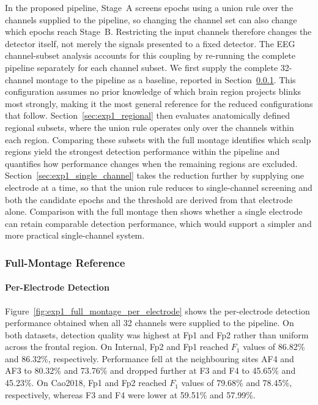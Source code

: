 \documentclass[journal,twoside,web]{ieeecolor}
\begin{document}
In the proposed pipeline, Stage~A screens epochs using a union rule over the channels supplied to the pipeline, so changing the channel set can also change which epochs reach Stage~B. Restricting the input channels therefore changes the detector itself, not merely the signals presented to a fixed detector. The EEG channel-subset analysis accounts for this coupling by re-running the complete pipeline separately for each channel subset. We first supply the complete 32-channel montage to the pipeline as a baseline, reported in Section~\ref{sec:exp1_reference}. This configuration assumes no prior knowledge of which brain region projects blinks most strongly, making it the most general reference for the reduced configurations that follow.
%
Section~\ref{sec:exp1_regional} then evaluates anatomically defined regional subsets, where the union rule operates only over the channels within each region. Comparing these subsets with the full montage identifies which scalp regions yield the strongest detection performance within the pipeline and quantifies how performance changes when the remaining regions are excluded.
%
Section~\ref{sec:exp1_single_channel} takes the reduction further by supplying one electrode at a time, so that the union rule reduces to single-channel screening and both the candidate epochs and the threshold are derived from that electrode alone. Comparison with the full montage then shows whether a single electrode can retain comparable detection performance, which would support a simpler and more practical single-channel system. 
%
\subsubsection{Full-Montage Reference}
\label{sec:exp1_reference}

%
\paragraph{Per-Electrode Detection}
\label{sec:exp1_per_electrode}

%
Figure~\ref{fig:exp1_full_montage_per_electrode} shows the per-electrode detection performance obtained when all 32 channels were supplied to the pipeline. On both datasets, detection quality was highest at Fp1 and Fp2 rather than uniform across the frontal region. On Internal, Fp2 and Fp1 reached $F_1$ values of 86.82\% and 86.32\%, respectively. Performance fell at the neighbouring sites AF4 and AF3 to 80.32\% and 73.76\% and dropped further at F3 and F4 to 45.65\% and 45.23\%. On Cao2018, Fp1 and Fp2 reached $F_1$ values of 79.68\% and 78.45\%, respectively, whereas F3 and F4 were lower at 59.51\% and 57.99\%.
 
\end{document}
